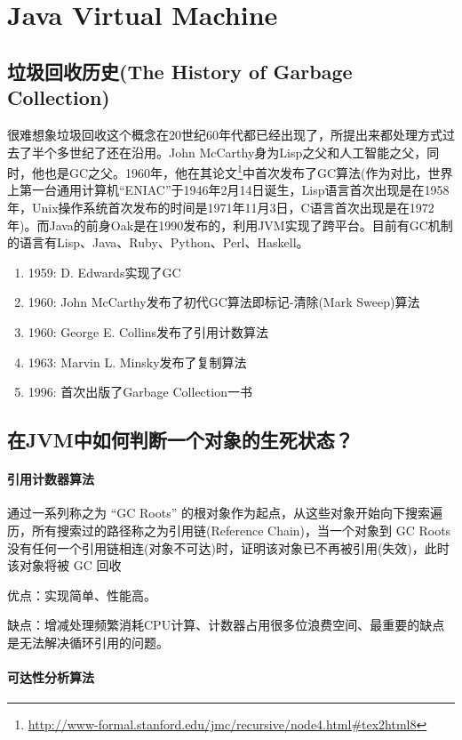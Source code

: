 \documentclass[../../../interview-questions.tex]{subfiles}
\begin{document}
\section{Java Virtual Machine}

\subsection{垃圾回收历史(The History of Garbage Collection)}

很难想象垃圾回收这个概念在20世纪60年代都已经出现了，所提出来都处理方式过去了半个多世纪了还在沿用。John McCarthy身为Lisp之父和人工智能之父，同时，他也是GC之父。1960年，他在其论文\footnote{\url{http://www-formal.stanford.edu/jmc/recursive/node4.html\#tex2html8}}中首次发布了GC算法(作为对比，世界上第一台通用计算机“ENIAC”于1946年2月14日诞生，Lisp语言首次出现是在1958年，Unix操作系统首次发布的时间是1971年11月3日，C语言首次出现是在1972年)。而Java的前身Oak是在1990发布的，利用JVM实现了跨平台。目前有GC机制的语言有Lisp、Java、Ruby、Python、Perl、Haskell。

\begin{enumerate}
\item{1959: D. Edwards实现了GC} 
\item{1960: John McCarthy发布了初代GC算法即标记-清除(Mark Sweep)算法}
\item{1960: George E. Collins发布了引用计数算法}
\item{1963: Marvin L. Minsky发布了复制算法}
\item{1996: 首次出版了Garbage Collection一书}
\end{enumerate}


\subsection{在JVM中如何判断一个对象的生死状态？}

\paragraph{引用计数器算法}
通过一系列称之为 “GC Roots” 的根对象作为起点，从这些对象开始向下搜索遍历，所有搜索过的路径称之为引用链(Reference Chain)，当一个对象到 GC Roots 没有任何一个引用链相连(对象不可达)时，证明该对象已不再被引用(失效)，此时该对象将被 GC 回收

优点：实现简单、性能高。

缺点：增减处理频繁消耗CPU计算、计数器占用很多位浪费空间、最重要的缺点是无法解决循环引用的问题。

\paragraph{可达性分析算法}
\end{document}
